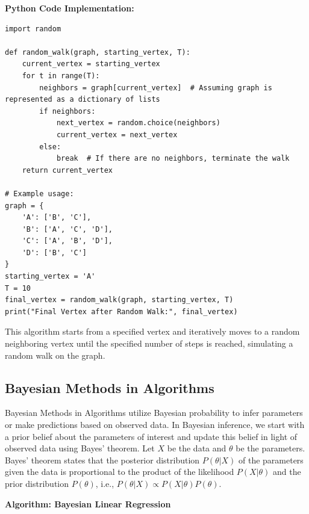 \documentclass[12pt]{book} %
\begin{document}
\FloatBarrier
\textbf{Python Code Implementation:}
\FloatBarrier
\begin{lstlisting}
import random

def random_walk(graph, starting_vertex, T):
    current_vertex = starting_vertex
    for t in range(T):
        neighbors = graph[current_vertex]  # Assuming graph is represented as a dictionary of lists
        if neighbors:
            next_vertex = random.choice(neighbors)
            current_vertex = next_vertex
        else:
            break  # If there are no neighbors, terminate the walk
    return current_vertex

# Example usage:
graph = {
    'A': ['B', 'C'],
    'B': ['A', 'C', 'D'],
    'C': ['A', 'B', 'D'],
    'D': ['B', 'C']
}
starting_vertex = 'A'
T = 10
final_vertex = random_walk(graph, starting_vertex, T)
print("Final Vertex after Random Walk:", final_vertex)
\end{lstlisting}
\FloatBarrier

This algorithm starts from a specified vertex and iteratively moves to a random neighboring vertex until the specified number of steps is reached, simulating a random walk on the graph.

\subsection{Bayesian Methods in Algorithms}
Bayesian Methods in Algorithms utilize Bayesian probability to infer parameters or make predictions based on observed data. In Bayesian inference, we start with a prior belief about the parameters of interest and update this belief in light of observed data using Bayes' theorem. Let \(X\) be the data and \(\theta\) be the parameters. Bayes' theorem states that the posterior distribution \(P(\theta | X)\) of the parameters given the data is proportional to the product of the likelihood \(P(X | \theta)\) and the prior distribution \(P(\theta)\), i.e., \(P(\theta | X) \propto P(X | \theta) P(\theta)\).

\textbf{Algorithm: Bayesian Linear Regression}
\end{document}
